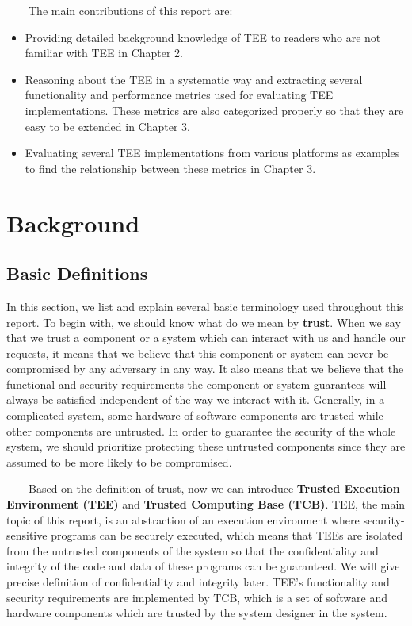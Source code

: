 \documentclass[12pt,twoside]{report}
\begin{document}
\ \ \ \ The main contributions of this report are:
\begin{itemize}
    \item Providing detailed background knowledge of TEE to readers who are not familiar with TEE in Chapter 2.
    \item Reasoning about the TEE in a systematic way and extracting several functionality and performance metrics used for evaluating TEE implementations. These metrics are also categorized properly so that they are easy to be extended in Chapter 3.
    \item Evaluating several TEE implementations from various platforms as examples to find the relationship between these metrics in Chapter 3.
\end{itemize}


\chapter{Background}
\section{Basic Definitions}

In this section, we list and explain several basic terminology used throughout this report. To begin with, we should know what do we mean by \textbf{trust}. When we say that we trust a component or a system which can interact with us and handle our requests, it means that we believe that this component or system can never be compromised by any adversary in any way. It also means that we believe that the functional and security requirements the component or system guarantees will always be satisfied independent of the way we interact with it. Generally, in a complicated system, some hardware of software components are trusted while other components are untrusted. In order to guarantee the security of the whole system, we should prioritize protecting these untrusted components since they are assumed to be more likely to be compromised.

\ \ \ \ Based on the definition of trust, now we can introduce \textbf{Trusted Execution Environment (TEE)} and \textbf{Trusted Computing Base (TCB)}. TEE, the main topic of this report, is an abstraction of an execution environment where security-sensitive programs can be securely executed, which means that TEEs are isolated from the untrusted components of the system so that the confidentiality and integrity of the code and data of these programs can be guaranteed. We will give precise definition of confidentiality and integrity later. TEE's functionality and security requirements are implemented by TCB, which is a set of software and hardware components which are trusted by the system designer in the system.
\end{document}
